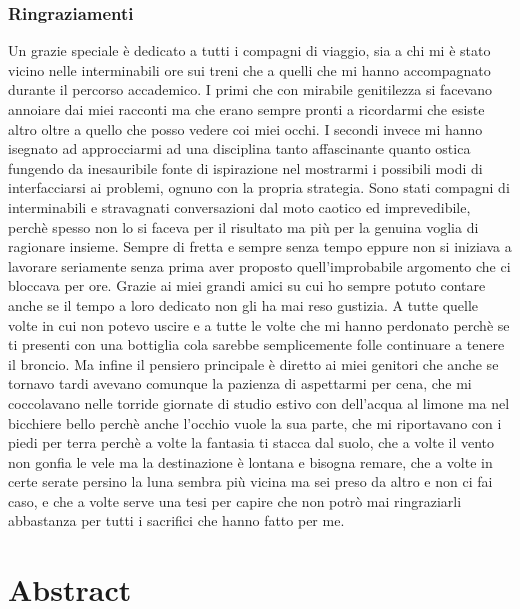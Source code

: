 \documentclass[12pt,a4paper]{book}
\begin{document}
	
	\tableofcontents  %
	
	\subsection*{Ringraziamenti}
	  Un grazie speciale è dedicato a tutti i compagni di viaggio, sia a chi mi è stato vicino nelle interminabili ore sui treni che a quelli che mi hanno accompagnato durante il percorso accademico. I primi che con mirabile genitilezza si facevano annoiare dai miei racconti ma che erano sempre pronti a ricordarmi che esiste altro oltre a quello che posso vedere coi miei occhi. I secondi invece mi hanno isegnato ad approcciarmi ad una disciplina tanto affascinante quanto ostica fungendo da inesauribile fonte di ispirazione nel mostrarmi i possibili modi di interfacciarsi ai problemi, ognuno con la propria strategia. Sono stati compagni di interminabili e stravagnati conversazioni dal moto caotico ed imprevedibile, perchè spesso non lo si faceva per il risultato ma più per la genuina voglia di ragionare insieme. Sempre di fretta e sempre senza tempo eppure non si iniziava a lavorare seriamente senza prima aver proposto quell'improbabile argomento che ci bloccava per ore. Grazie ai miei grandi amici su cui ho sempre potuto contare anche se il tempo a loro dedicato non gli ha mai reso gustizia. A tutte quelle volte in cui non potevo uscire e a tutte le volte che mi hanno perdonato perchè se ti presenti con una bottiglia cola sarebbe semplicemente folle continuare a tenere il broncio. Ma infine il pensiero principale è diretto ai miei genitori che anche se tornavo tardi avevano comunque la pazienza di aspettarmi per cena, che mi coccolavano nelle torride giornate di studio estivo con dell'acqua al limone ma nel bicchiere bello perchè anche l'occhio vuole la sua parte, che mi riportavano con i piedi per terra perchè a volte la fantasia ti stacca dal suolo, che a volte il vento non gonfia le vele ma la destinazione è lontana e bisogna remare, che a volte in certe serate persino la luna sembra più vicina ma sei preso da altro e non ci fai caso, e che a volte serve una tesi per capire che non potrò mai ringraziarli abbastanza per tutti i sacrifici che hanno fatto per me.
	
	\chapter{Abstract}
	
\end{document}
